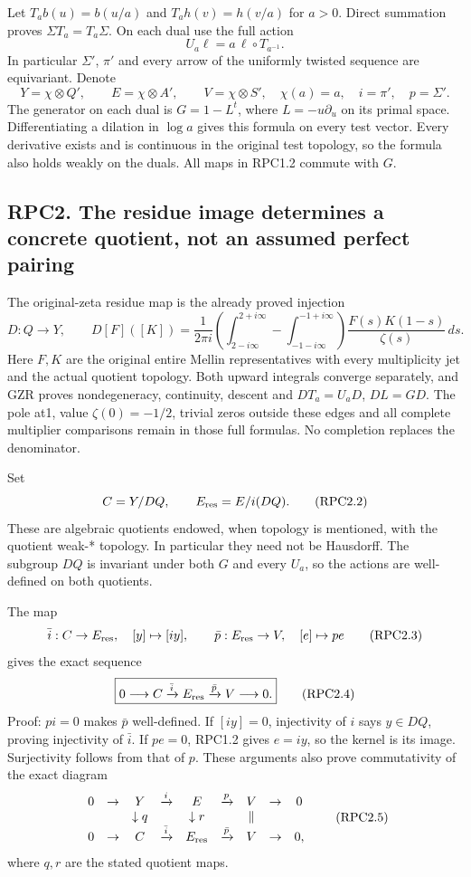 Let \(T_ab(u)=b(u/a)\) and \(T_ah(v)=h(v/a)\) for \(a>0\). Direct
summation proves \(\Sigma T_a=T_a\Sigma\). On each dual use the full
action \[
U_a\ell=a\,\ell\circ T_{a^{-1}}.
\tag{RPC1.3}
\] In particular \(\Sigma'\), \(\pi'\) and every arrow of the uniformly
twisted sequence are equivariant. Denote \[
Y=\chi\otimes Q',\qquad E=\chi\otimes A',\qquad V=\chi\otimes S',
\quad \chi(a)=a,
\quad i=\pi',\quad p=\Sigma'.
\tag{RPC1.4}
\] The generator on each dual is \(G=1-L^t\), where \(L=-u\partial_u\)
on its primal space. Differentiating a dilation in \(\log a\) gives this
formula on every test vector. Every derivative exists and is continuous
in the original test topology, so the formula also holds weakly on the
duals. All maps in RPC1.2 commute with \(G\).

\subsection{RPC2. The residue image determines a concrete quotient, not
an assumed perfect
pairing}\label{rpc2.-the-residue-image-determines-a-concrete-quotient-not-an-assumed-perfect-pairing}

The original-zeta residue map is the already proved injection \[
D:Q\longrightarrow Y,\qquad
D[F]([K])=\frac1{2\pi i}
\left(\int_{2-i\infty}^{2+i\infty}-\int_{-1-i\infty}^{-1+i\infty}\right)
\frac{F(s)K(1-s)}{\zeta(s)}\,ds.
\tag{RPC2.1}
\] Here \(F,K\) are the original entire Mellin representatives with
every multiplicity jet and the actual quotient topology. Both upward
integrals converge separately, and GZR proves nondegeneracy, continuity,
descent and \(DT_a=U_aD\), \(DL=GD\). The pole at1, value
\(\zeta(0)=-1/2\), trivial zeros outside these edges and all complete
multiplier comparisons remain in those full formulas. No completion
replaces the denominator.

Set \[
C=Y/DQ,\qquad E_{\rm res}=E/i(DQ).
\tag{RPC2.2}
\] These are algebraic quotients endowed, when topology is mentioned,
with the quotient weak-* topology. In particular they need not be
Hausdorff. The subgroup \(DQ\) is invariant under both \(G\) and every
\(U_a\), so the actions are well-defined on both quotients.

The map \[
\bar i:C\to E_{\rm res},\quad [y]\mapsto[iy],
\qquad
\bar p:E_{\rm res}\to V,\quad[e]\mapsto pe
\tag{RPC2.3}
\] gives the exact sequence \[
\boxed{0\longrightarrow C\xrightarrow{\bar i}E_{\rm res}
\xrightarrow{\bar p}V\longrightarrow0.}
\tag{RPC2.4}
\] Proof: \(p i=0\) makes \(\bar p\) well-defined. If \([iy]=0\),
injectivity of \(i\) says \(y\in DQ\), proving injectivity of
\(\bar i\). If \(pe=0\), RPC1.2 gives \(e=iy\), so the kernel is its
image. Surjectivity follows from that of \(p\). These arguments also
prove commutativity of the exact diagram \[
\begin{array}{ccccccccc}
0&\to&Y&\xrightarrow{i}&E&\xrightarrow{p}&V&\to&0\\
&&\downarrow q&&\downarrow r&&\Vert&&\\
0&\to&C&\xrightarrow{\bar i}&E_{\rm res}&\xrightarrow{\bar p}&V&\to&0,
\end{array}
\tag{RPC2.5}
\] where \(q,r\) are the stated quotient maps.

